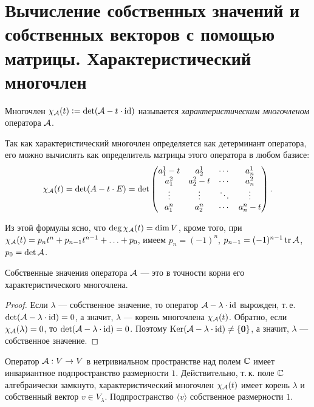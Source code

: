 \section{Вычисление собственных значений и собственных векторов с помощью матрицы. Характеристический многочлен}

\begin{definition}
    Многочлен $\chi_{\mathcal{A}}(t) \vcentcolon = \det(\mathcal{A} - t \cdot \operatorname{id})$ называется \textit{характеристическим многочленом} оператора $\mathcal{A}$.
\end{definition}

Так как характеристический многочлен определяется как детерминант оператора, его можно вычислять как определитель матрицы этого оператора в любом базисе:
\[
    \chi_{\mathcal{A}}(t) = \det(A - t \cdot E) = \det
    \begin{pmatrix}
        a^1_1 - t & a^1_2 & \cdots & a^1_n\\
        a^2_1 & a^2_2 - t & \cdots & a^2_n\\
        \vdots & \vdots & \ddots & \vdots\\
        a^n_1 & a^n_2 & \cdots & a^n_n - t\\
    \end{pmatrix}.
\]

Из этой формулы ясно, что $\deg\chi_{\mathcal{A}}(t) = \dim V$, кроме того, при $\chi_{\mathcal{A}}(t) = p_nt^n + p_{n - 1}t^{n - 1} + \ldots + p_0$, имеем $p_n = (-1)^n$, $p_{n - 1} = (-1)^{n - 1}\operatorname{tr}\mathcal{A}$, $p_0 = \det\mathcal{A}$.

\begin{proposal}
    Собственные значения оператора $\mathcal{A}$ --- это в точности корни его характеристического многочлена.
\end{proposal}

\begin{proof}
    Если $\lambda$ --- собственное значение, то оператор $\mathcal{A} - \lambda \cdot \operatorname{id}$ вырожден, т.\,е. $\det(\mathcal{A} - \lambda \cdot \operatorname{id}) = 0$, а значит, $\lambda$ --- корень многочлена $\chi_{\mathcal{A}}(t)$. Обратно, если $\chi_{\mathcal{A}}(\lambda) = 0$, то $\det(\mathcal{A} - \lambda \cdot \operatorname{id}) = 0$. Поэтому $\operatorname{Ker}(\mathcal{A} - \lambda \cdot \operatorname{id}) \ne \{\boldsymbol{0}\}$, а значит, $\lambda$ --- собственное значение.
\end{proof}

\begin{remark}
    Оператор $\mathcal{A}: V \to V$ в нетривиальном пространстве над полем $\mathbb{C}$ имеет инвариантное подпространство размерности $1$. Действительно, т.\,к. поле $\mathbb{C}$ алгебраически замкнуто, характеристический многочлен $\chi_{\mathcal{A}}(t)$ имеет корень $\lambda$ и собственный вектор $v \in V_\lambda$. Подпространство $\langle v\rangle$ собственное размерности $1$.
\end{remark}


